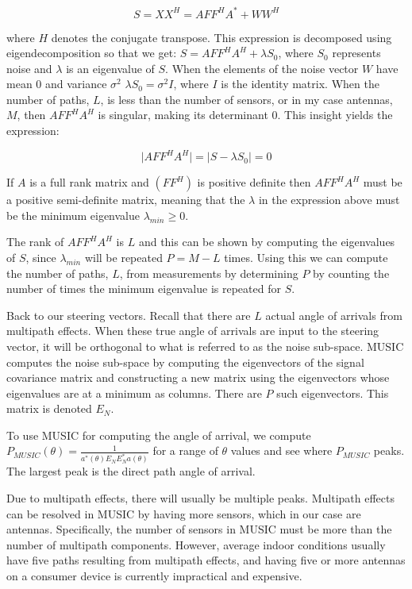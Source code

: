 \documentclass[12pt]{report}
\begin{document}
$$S = XX^{H} = A FF^{H} A^{*} + WW^{H}$$

where $H$ denotes the conjugate transpose. This expression is decomposed using eigendecomposition so that we get: $S = A FF^{H} A^{H} + \lambda S_{0}$, where $S_{0}$ represents noise and $\lambda$ is an eigenvalue of $S$. When the elements of the noise vector $W$ have mean 0 and variance $\sigma^{2}$ $\lambda S_{0} = \sigma^{2} I$, where $I$ is the identity matrix. When the number of paths, $L$, is less than the number of sensors, or in my case antennas, $M$, then $A FF^{H} A^{H}$ is singular, making its determinant 0. This insight yields the expression:

$$\lvert A FF^{H} A^{H} \rvert = \lvert S - \lambda S_{0} \rvert = 0$$

If $A$ is a full rank matrix and $(FF^{H})$ is positive definite then $A FF^{H} A^{H}$ must be a positive semi-definite matrix, meaning that the $\lambda$ in the expression above must be the minimum eigenvalue $\lambda_{min} \geq 0$. \par

The rank of $A FF^{H} A^{H}$ is $L$ and this can be shown by computing the eigenvalues of $S$, since $\lambda_{min}$ will be repeated $P = M - L$ times. Using this we can compute the number of paths, $L$, from measurements by determining $P$ by counting the number of times the minimum eigenvalue is repeated for $S$. \par

Back to our steering vectors. Recall that there are $L$ actual angle of arrivals from multipath effects. When these true angle of arrivals are input to the steering vector, it will be orthogonal to what is referred to as the noise sub-space. MUSIC computes the noise sub-space by computing the eigenvectors of the signal covariance matrix and constructing a new matrix using the eigenvectors whose eigenvalues are at a minimum as columns. There are $P$ such eigenvectors. This matrix is denoted $E_{N}$. \par

To use MUSIC for computing the angle of arrival, we compute $P_{MUSIC}(\theta) = \frac{1}{a^{*}(\theta) E_{N} E_{N}^{*} a(\theta)}$ for a range of $\theta$ values and see where $P_{MUSIC}$ peaks. The largest peak is the direct path angle of arrival. \par

Due to multipath effects, there will usually be multiple peaks. Multipath effects can be resolved in MUSIC by having more sensors, which in our case are antennas. Specifically, the number of sensors in MUSIC must be more than the number of multipath components. However, average indoor conditions usually have five paths resulting from multipath effects, and having five or more antennas on a consumer device is currently impractical and expensive. \par
\end{document}
